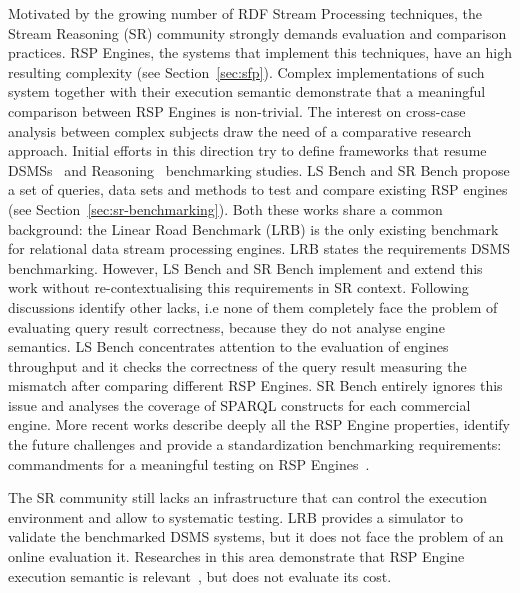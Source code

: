 Motivated by the growing number of RDF Stream Processing techniques, the Stream Reasoning (SR) community strongly demands evaluation and comparison practices. RSP Engines, the systems that implement this techniques, have an high resulting complexity (see Section~\ref{sec:sfp}). Complex implementations of such system together with their execution semantic demonstrate that a meaningful comparison between RSP Engines is non-trivial. %
The interest on cross-case analysis between complex subjects draw the need of a comparative research approach. Initial efforts in this direction try to define frameworks that resume  DSMSs~\cite{arasu2004linear} and Reasoning~\cite{Guo2005} benchmarking studies. LS Bench and SR Bench propose a set of queries, data sets and methods to test and compare existing RSP engines (see Section~\ref{sec:sr-benchmarking}). Both these works share a common background: the Linear Road Benchmark (LRB) is the only existing benchmark for relational data stream processing engines. LRB states the requirements DSMS benchmarking. However, LS Bench and SR Bench implement and extend this work without re-contextualising this requirements in SR context. Following discussions identify other lacks, i.e none of them completely face the problem of evaluating query result correctness, because they do not analyse engine semantics. LS Bench concentrates attention to the evaluation of engines throughput and it checks the correctness of the query result measuring the mismatch after comparing different RSP Engines. SR Bench entirely ignores this issue and analyses the coverage of SPARQL constructs for each commercial engine. More recent works describe deeply all the RSP Engine properties, identify the future challenges and provide a standardization benchmarking requirements: commandments for a meaningful testing on RSP Engines~\cite{DBLP:conf/esws/ScharrenbachUMVB13}.

The SR community still lacks an infrastructure that can control the execution environment and allow to systematic testing. LRB provides a simulator to validate the benchmarked DSMS systems, but it does not face the problem of an online evaluation it. Researches in this area demonstrate that RSP Engine execution semantic is relevant~\cite{Botan:2010:SMA:1920841.1920874}, but does not evaluate its cost.

